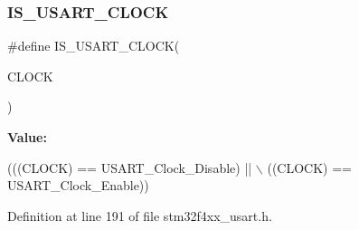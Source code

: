 \subsubsection{\texorpdfstring{I\+S\+\_\+\+U\+S\+A\+R\+T\+\_\+\+C\+L\+O\+CK}{IS\_USART\_CLOCK}}
{\footnotesize\ttfamily \#define I\+S\+\_\+\+U\+S\+A\+R\+T\+\_\+\+C\+L\+O\+CK(\begin{DoxyParamCaption}\item[{}]{C\+L\+O\+CK }\end{DoxyParamCaption})}

{\bfseries Value\+:}
\begin{DoxyCode}
(((CLOCK) == USART\_Clock\_Disable) || \(\backslash\)
                               ((CLOCK) == USART\_Clock\_Enable))
\end{DoxyCode}


Definition at line 191 of file stm32f4xx\+\_\+usart.\+h.

